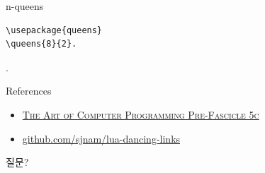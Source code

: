 \documentclass{beamer}
\begin{document}
%
\begin{frame}[fragile]{n-queens}
\begin{verbatim}
\usepackage{queens}
\queens{8}{2}.
\end{verbatim}
\vspace{-10mm}
.
\end{frame}

%
\begin{frame}{References}
  \begin{itemize}
  \item \href{http://www-cs-faculty.stanford.edu/~knuth/fasc5c.ps.gz}
    {\textsc{The Art of Computer Programming Pre-Fascicle 5c}}
  \item \href{https://github.com/sjnam/lua-dancing-links}
    {github.com/sjnam/lua-dancing-links}
  \end{itemize}
\end{frame}

%
\begin{frame}[standout]
  질문?
\end{frame}
\end{document}
